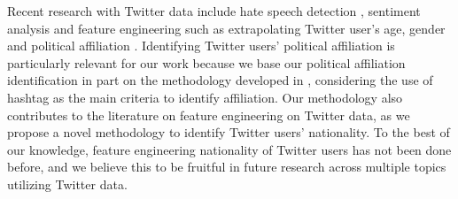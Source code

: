     \newline\indent
    Recent research with Twitter data include hate speech detection \citep{plaza-del-arco_comparing_2021, basile_semeval_2019, pereira-kohatsu_detecting_2019}, sentiment analysis \citep{agarwal2011sentiment, saif2012semantic} and feature engineering such as extrapolating Twitter user's age, gender and political affiliation \citep{conover_predicting_2011, pennacchiotti2011machine, kruspe_changes_2021}. Identifying Twitter users' political affiliation is particularly relevant for our work because we base our political affiliation identification in part on the methodology developed in \cite{rao2010classifying}, considering the use of hashtag as the main criteria to identify affiliation. Our methodology also contributes to the literature on feature engineering on Twitter data, as we propose a novel methodology to identify Twitter users' nationality. To the best of our knowledge, feature engineering nationality of Twitter users has not been done before, and we believe this to be fruitful in future research across multiple topics utilizing Twitter data.
    
    
